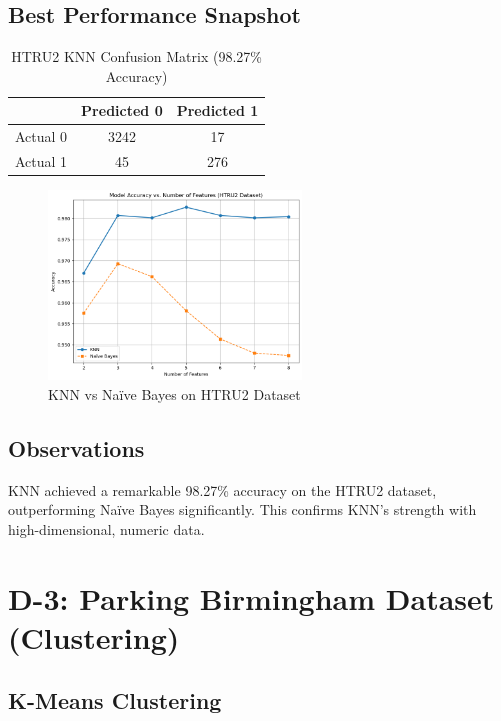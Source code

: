 \subsection{Best Performance Snapshot}

\begin{table}[H]
\centering
\caption{HTRU2 KNN Confusion Matrix (98.27\% Accuracy)}
\label{tab:htru2_confusion}
\begin{tabular}{|c|c|c|}
\hline
           & Predicted 0 & Predicted 1 \\
\hline
Actual 0   & 3242        & 17           \\
Actual 1   & 45          & 276          \\
\hline
\end{tabular}
\end{table}

\begin{figure}[H]
    \centering
    \includegraphics[width=0.6\textwidth]{figures/htru2_accuracy_plot.png}
    \caption{KNN vs Naïve Bayes on HTRU2 Dataset}
    \label{fig:htru2_accuracy}
\end{figure}

\subsection{Observations}

KNN achieved a remarkable 98.27\% accuracy on the HTRU2 dataset, outperforming Naïve Bayes significantly. This confirms KNN’s strength with high-dimensional, numeric data.

\section{D-3: Parking Birmingham Dataset (Clustering)}
\label{sec:results_parking}

\subsection{K-Means Clustering}

